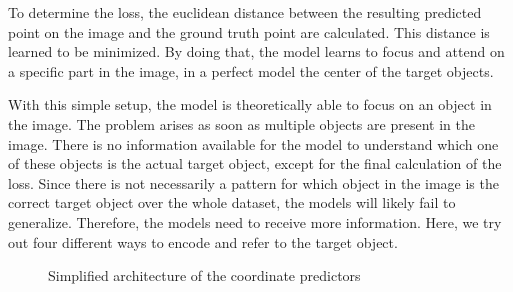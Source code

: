 To determine the loss, the euclidean distance between the resulting predicted point on the image and the ground truth point are calculated.
This distance is learned to be minimized.
By doing that, the model learns to focus and attend on a specific part in the image, in a perfect model the center of the target objects.

With this simple setup, the model is theoretically able to focus on an object in the image.
The problem arises as soon as multiple objects are present in the image.
There is no information available for the model to understand which one of these objects is the actual target object, except for the final calculation of the loss.
Since there is not necessarily a pattern for which object in the image is the correct target object over the whole dataset, the models will likely fail to generalize.
Therefore, the models need to receive more information.
Here, we try out four different ways to encode and refer to the target object.

\begin{figure}[ht]
    \centering
    \caption{Simplified architecture of the coordinate predictors}
\end{figure}

